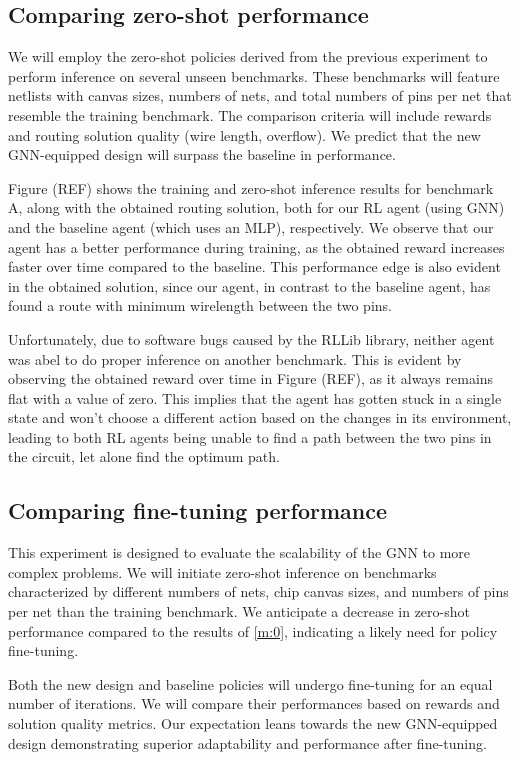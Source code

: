 \documentclass[letterpaper]{article}
\begin{document}
\subsection{Comparing zero-shot performance} \label{m:0} We will employ the
zero-shot policies derived from the previous experiment to perform inference on
several unseen benchmarks. These benchmarks will feature netlists with canvas
sizes, numbers of nets, and total numbers of pins per net that resemble the
training benchmark. The comparison criteria will include rewards and routing
solution quality (wire length, overflow). We predict that the new GNN-equipped
design will surpass the baseline in performance.

Figure (REF) shows the training and zero-shot inference results for benchmark A,
along with the obtained routing solution, both for our RL agent (using GNN) and
the baseline agent (which uses an MLP), respectively. We observe that our agent
has a better performance during training, as the obtained reward increases
faster over time compared to the baseline. This performance edge is also evident
in the obtained solution, since our agent, in contrast to the baseline agent,
has found a route with minimum wirelength between the two pins.

Unfortunately, due to software bugs caused by the RLLib library, neither agent
was abel to do proper inference on another benchmark. This is evident by
observing the obtained reward over time in Figure (REF), as it always remains
flat with a value of zero. This implies that the agent has gotten stuck in a
single state and won't choose a different action based on the changes in its
environment, leading to both RL agents being unable to find a path between the
two pins in the circuit, let alone find the optimum path.

\subsection{Comparing fine-tuning performance}
This experiment is designed to evaluate the scalability of the GNN to more
complex problems. We will initiate zero-shot inference on benchmarks
characterized by different numbers of nets, chip canvas sizes, and numbers of
pins per net than the training benchmark. We anticipate a decrease in zero-shot
performance compared to the results of \autoref{m:0}, indicating a likely need
for policy fine-tuning.

Both the new design and baseline policies will undergo fine-tuning for an equal
number of iterations. We will compare their performances based on rewards and
solution quality metrics. Our expectation leans towards the new GNN-equipped
design demonstrating superior adaptability and performance after fine-tuning.
\end{document}
